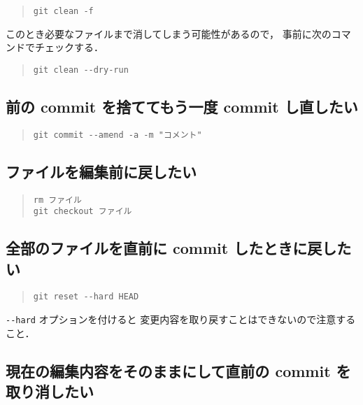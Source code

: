 \documentclass[a4j,10pt]{jarticle}
\begin{document}
\begin{quote}
\begin{verbatim}
git clean -f
\end{verbatim}
\end{quote}

このとき必要なファイルまで消してしまう可能性があるので，
事前に次のコマンドでチェックする．

\begin{quote}
\begin{verbatim}
git clean --dry-run
\end{verbatim}
\end{quote}

\subsection{前の commit を捨ててもう一度 commit し直したい}

\begin{quote}
\begin{verbatim}
git commit --amend -a -m "コメント"
\end{verbatim}
\end{quote}

\subsection{ファイルを編集前に戻したい}

\begin{quote}
\begin{verbatim}
rm ファイル
git checkout ファイル
\end{verbatim}
\end{quote}

\subsection{全部のファイルを直前に commit したときに戻したい}

\begin{quote}
\begin{verbatim}
git reset --hard HEAD
\end{verbatim}
\end{quote}

\verb|--hard| オプションを付けると
変更内容を取り戻すことはできないので注意すること．

\subsection{現在の編集内容をそのままにして直前の commit を取り消したい}
\end{document}
